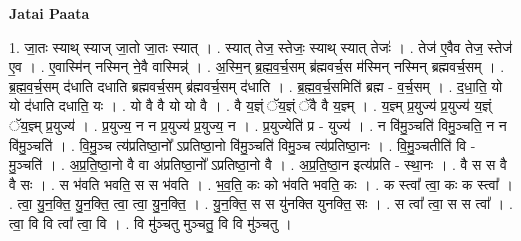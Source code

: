 \documentclass[17pt]{extarticle}
\begin{document}
\textbf{Jatai Paata} \newline

1. जा॒तः स्याथ् स्याज् जा॒तो जा॒तः स्यात् । . स्यात् तेज॒ स्तेजः॒ स्याथ् स्यात् तेजः॑ । . तेज॑ ए॒वैव तेज॒ स्तेज॑ ए॒व । . ए॒वास्मि॑न् नस्मिन् ने॒वै वास्मिन्न्॑ । . अ॒स्मि॒न् ब्र॒ह्म॒व॒र्च॒सम् ब्र॑ह्मवर्च॒स म॑स्मिन् नस्मिन् ब्रह्मवर्च॒सम् । . ब्र॒ह्म॒व॒र्च॒सम् द॑धाति दधाति ब्रह्मवर्च॒सम् ब्र॑ह्मवर्च॒सम् द॑धाति । . ब्र॒ह्म॒व॒र्च॒समिति॑ ब्रह्म - व॒र्च॒सम् । . द॒धा॒ति॒ यो यो द॑धाति दधाति॒ यः । . यो वै वै यो यो वै । . वै य॒ज्ञ्ं ॅय॒ज्ञ्ं ॅवै वै य॒ज्ञ्म् । . य॒ज्ञ्म् प्र॒युज्य॑ प्र॒युज्य॑ य॒ज्ञ्ं ॅय॒ज्ञ्म् प्र॒युज्य॑ । . प्र॒युज्य॒ न न प्र॒युज्य॑ प्र॒युज्य॒ न । . प्र॒युज्येति॑ प्र - युज्य॑ । . न वि॑मु॒ञ्चति॑ विमु॒ञ्चति॒ न न वि॑मु॒ञ्चति॑ । . वि॒मु॒ञ्च त्य॑प्रतिष्ठा॒नो᳚ ऽप्रतिष्ठा॒नो वि॑मु॒ञ्चति॑ विमु॒ञ्च त्य॑प्रतिष्ठा॒नः । . वि॒मु॒ञ्चतीति॑ वि - मु॒ञ्चति॑ । . अ॒प्र॒ति॒ष्ठा॒नो वै वा अ॑प्रतिष्ठा॒नो᳚ ऽप्रतिष्ठा॒नो वै । . अ॒प्र॒ति॒ष्ठा॒न इत्य॑प्रति - स्था॒नः । . वै स स वै वै सः । . स भ॑वति भवति॒ स स भ॑वति । . भ॒व॒ति॒ कः को भ॑वति भवति॒ कः । . क स्त्वा᳚ त्वा॒ कः क स्त्वा᳚ । . त्वा॒ यु॒न॒क्ति॒ यु॒न॒क्ति॒ त्वा॒ त्वा॒ यु॒न॒क्ति॒ । . यु॒न॒क्ति॒ स स यु॑नक्ति युनक्ति॒ सः । . स त्वा᳚ त्वा॒ स स त्वा᳚ । . त्वा॒ वि वि त्वा᳚ त्वा॒ वि । . वि मु॑ञ्चतु मुञ्चतु॒ वि वि मु॑ञ्चतु । \newline
\end{document}
